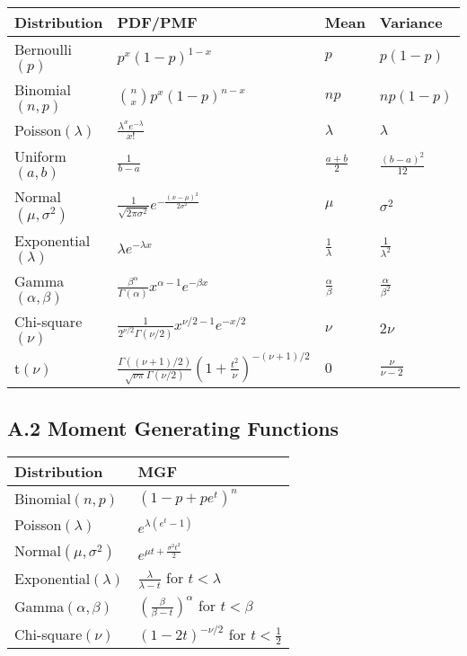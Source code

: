 \documentclass[12pt,a4paper]{amsart}
\theoremstyle{remark}
\begin{document}
\begin{table}[h]
\centering
\begin{tabular}{|l|l|l|l|}
\hline
\textbf{Distribution} & \textbf{PDF/PMF} & \textbf{Mean} & \textbf{Variance} \\
\hline
Bernoulli$(p)$ & $p^x(1-p)^{1-x}$ & $p$ & $p(1-p)$ \\
\hline
Binomial$(n,p)$ & $\binom{n}{x}p^x(1-p)^{n-x}$ & $np$ & $np(1-p)$ \\
\hline
Poisson$(\lambda)$ & $\frac{\lambda^x e^{-\lambda}}{x!}$ & $\lambda$ & $\lambda$ \\
\hline
Uniform$(a,b)$ & $\frac{1}{b-a}$ & $\frac{a+b}{2}$ & $\frac{(b-a)^2}{12}$ \\
\hline
Normal$(\mu,\sigma^2)$ & $\frac{1}{\sqrt{2\pi\sigma^2}}e^{-\frac{(x-\mu)^2}{2\sigma^2}}$ & $\mu$ & $\sigma^2$ \\
\hline
Exponential$(\lambda)$ & $\lambda e^{-\lambda x}$ & $\frac{1}{\lambda}$ & $\frac{1}{\lambda^2}$ \\
\hline
Gamma$(\alpha,\beta)$ & $\frac{\beta^\alpha}{\Gamma(\alpha)}x^{\alpha-1}e^{-\beta x}$ & $\frac{\alpha}{\beta}$ & $\frac{\alpha}{\beta^2}$ \\
\hline
Chi-square$(\nu)$ & $\frac{1}{2^{\nu/2}\Gamma(\nu/2)}x^{\nu/2-1}e^{-x/2}$ & $\nu$ & $2\nu$ \\
\hline
t$(\nu)$ & $\frac{\Gamma((\nu+1)/2)}{\sqrt{\nu\pi}\Gamma(\nu/2)}(1+\frac{t^2}{\nu})^{-(\nu+1)/2}$ & $0$ & $\frac{\nu}{\nu-2}$ \\
\hline
\end{tabular}
\end{table}

\subsection{A.2 Moment Generating Functions}

\begin{table}[h]
\centering
\begin{tabular}{|l|l|}
\hline
\textbf{Distribution} & \textbf{MGF} \\
\hline
Binomial$(n,p)$ & $(1-p+pe^t)^n$ \\
\hline
Poisson$(\lambda)$ & $e^{\lambda(e^t-1)}$ \\
\hline
Normal$(\mu,\sigma^2)$ & $e^{\mu t + \frac{\sigma^2 t^2}{2}}$ \\
\hline
Exponential$(\lambda)$ & $\frac{\lambda}{\lambda-t}$ for $t < \lambda$ \\
\hline
Gamma$(\alpha,\beta)$ & $\left(\frac{\beta}{\beta-t}\right)^\alpha$ for $t < \beta$ \\
\hline
Chi-square$(\nu)$ & $(1-2t)^{-\nu/2}$ for $t < \frac{1}{2}$ \\
\hline
\end{tabular}
\end{table}
\end{document}
